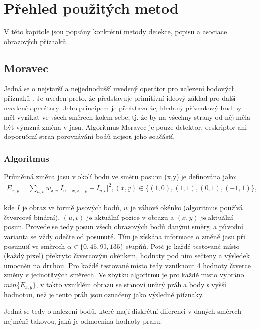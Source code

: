 


\chapter{Přehled použitých metod}

V této kapitole jsou popsány konkrétní metody detekce, popisu a asociace obrazových příznaků.

\section{Moravec}

Jedná se o nejstarší a nejjednodušší uvedený operátor pro nalezení bodových příznaků \cite{moravec1980obstacle}. Je uveden proto, že představuje primitivní ideový základ pro další uvedené operátory. Jeho principem je představa že, hledaný příznakový bod by měl vynikat ve všech směrech kolem sebe, tj. že by na všechny strany od něj měla být výrazná změna v jasu. Algoritmus Moravec je pouze detektor, deskriptor ani doporučení stran porovnávání bodů nejsou jeho součástí.

\subsection{Algoritmus}

Průměrná změna jasu v okolí bodu ve směru posunu (x,y) je definována jako:
\begin{align}	
E_{x,y} = \sum_{u,v} w_{u,v} \lvert I_{u+x, v+y} - I_{u,v} \rvert^2 , (x,y) \in \{(1,0), (1,1), (0,1), (-1,1)\},
\end{align}
	
kde  $I$ je obraz ve formě jasových bodů, $w$ je váhové okénko (algoritmus používá čtvercové binární), $(u,v)$ je aktuální pozice v obrazu a $(x,y)$ je aktuální posun. Provede se tedy posun všech obrazových bodů danými směry, a  původní varianta se vždy odečte od posunuté. Tím je získána informace o změně jasu při posunutí ve směrech  $\alpha \in \{0, 45, 90, 135\}$ stupňů. Poté je každé testované místo (každý pixel) překryto čtvercovým okénkem, hodnoty pod ním sečteny a výsledek umocněn na druhou. Pro každé testované místo tedy vzniknout 4 hodnoty čtverce změny v jednotlivých směrech.
Ve zbytku algoritmu je pro každé místo vybráno $min\{E_{x,y}\}$, v takto vzniklém obrazu se stanoví určitý práh a body s vyšší hodnotou, než je tento práh jsou označeny jako výsledné příznaky.

Jedná se tedy o nalezení bodů, které mají diskrétní diferenci v daných směrech nejméně takovou, jaká je odmocnina
hodnoty prahu.

